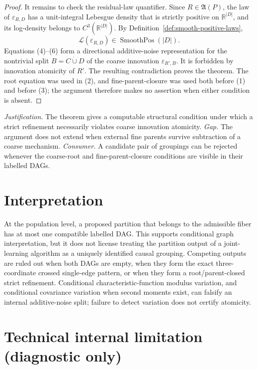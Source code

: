 \documentclass{article}
\begin{document}
\begin{proof}
It remains to check the residual-law quantifier.  Since \(R\in\mathfrak A(P)\),
the law of \(\varepsilon_{R,D}\) has a unit-integral Lebesgue density that is
strictly positive on \(\mathbb R^{|D|}\), and its log-density belongs to
\(C^3(\mathbb R^{|D|})\).  By
Definition~\ref{def:smooth-positive-laws},
\[
 \mathcal L(\varepsilon_{R,D})\in\operatorname{SmoothPos}(|D|). \tag{6}
\]
Equations (4)--(6) form a directional additive-noise representation for the
nontrivial split \(B=C\mathbin{\dot\cup}D\) of the coarse innovation
\(\varepsilon_{R',B}\).  It is forbidden by innovation atomicity of \(R'\).
The resulting contradiction proves the theorem.  The root equation was used
in (2), and fine-parent-closure was used both before (1) and before (3); the
argument therefore makes no assertion when either condition is absent.
\end{proof}
\par\smallskip\noindent \textit{Justification.} The theorem gives a computable structural condition under which a strict refinement necessarily violates coarse innovation atomicity. \textit{Gap.} The argument does not extend when external fine parents survive subtraction of a coarse mechanism. \textit{Consumer.} A candidate pair of groupings can be rejected whenever the coarse-root and fine-parent-closure conditions are visible in their labelled DAGs.

\section{Interpretation}

At the population level, a proposed partition that belongs to the admissible fiber has at most one compatible labelled DAG. This supports conditional graph interpretation, but it does not license treating the partition output of a joint-learning algorithm as a uniquely identified causal grouping. Competing outputs are ruled out when both DAGs are empty, when they form the exact three-coordinate crossed single-edge pattern, or when they form a root/parent-closed strict refinement. Conditional characteristic-function modulus variation, and conditional covariance variation when second moments exist, can falsify an internal additive-noise split; failure to detect variation does not certify atomicity.

\section*{Technical internal limitation (diagnostic only)}
\end{document}
